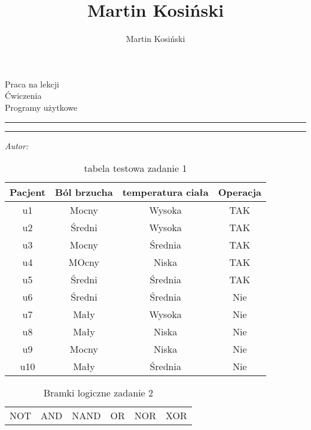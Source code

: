 \documentclass[a4paper]{article}
\title{Martin Kosiński}
\author{Martin Kosiński}
\makeatletter
\newcommand{\linia}{\rule{\linewidth}{0.4mm}}
\renewcommand{\maketitle}{\begin{titlepage}
    \vspace*{1cm}
    \begin{center}\small
   Praca na lekcji\\
    Ćwiczenia\\
    Programy użytkowe
    \end{center}
    \vspace{3cm}
    \noindent\linia
    \begin{center}
      \LARGE \textsc{\@title}
         \end{center}
     \linia
    \vspace{0.5cm}
    \begin{flushright}
    \begin{minipage}{5cm}
    \textit{\small Autor:}\\
    \normalsize \textsc{\@author} \par
    \end{minipage}
     \end{flushright}
    \vspace*{\stretch{6}}
    \begin{center}
    \@date
    \end{center}
  \end{titlepage}%
}
\makeatother
\begin{document}
\maketitle
\begin{center}


\begin{table}[h]
\centering\caption{tabela testowa zadanie 1 }

\begin{tabular}{c| c c c }
\hline\hline
Pacjent & Ból brzucha & temperatura ciała & Operacja\\
\hline
u1 & Mocny & Wysoka & TAK\\
u2 & Średni & Wysoka & TAK\\
u3 & Mocny & Średnia & TAK\\
u4 & MOcny & Niska & TAK\\
u5 & Średni & Średnia & TAK\\
u6 & Średni & Średnia & Nie\\
u7 & Mały & Wysoka & Nie\\
u8 & Mały & Niska & Nie\\
u9 & Mocny & Niska & Nie\\
u10 & Mały & Średnia & Nie\\
\hline\hline



\end{tabular}

\end{table}
\begin{table}[h]
\centering\caption{Bramki logiczne zadanie 2 }

\begin{tabular}{||c||c||c||c||c||c|| }
\hline\hline
NOT & AND & NAND & OR & NOR & XOR\\


\end{tabular}
\end{table}
\end{center}
\end{document}
